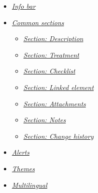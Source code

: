 \documentclass[letterpaper,10pt,english]{sphinxmanual}
\begin{document}
{\begin{minipage}{0.95\linewidth}
\begin{itemize}
\begin{itemize}
\item {} 
\label{Gui:id27}{\hyperref[Gui:email-detail]{\emph{Email detail}}}

\item {} 
\label{Gui:id28}{\hyperref[Gui:multiple-update]{\emph{Multiple update}}}

\item {} 
\label{Gui:id29}{\hyperref[Gui:combo-list-fields]{\emph{Combo list fields}}}

\item {} 
\label{Gui:id30}{\hyperref[Gui:long-text-fields]{\emph{Long text fields}}}

\end{itemize}

\item {} 
\label{Gui:id31}{\hyperref[Gui:info-bar]{\emph{Info bar}}}

\item {} 
\label{Gui:id32}{\hyperref[Gui:common-sections]{\emph{Common sections}}}
\begin{itemize}
\item {} 
\label{Gui:id33}{\hyperref[Gui:section-description]{\emph{Section: Description}}}

\item {} 
\label{Gui:id34}{\hyperref[Gui:section-treatment]{\emph{Section: Treatment}}}

\item {} 
\label{Gui:id35}{\hyperref[Gui:section-checklist]{\emph{Section: Checklist}}}

\item {} 
\label{Gui:id36}{\hyperref[Gui:section-linked-element]{\emph{Section: Linked element}}}

\item {} 
\label{Gui:id37}{\hyperref[Gui:section-attachments]{\emph{Section: Attachments}}}

\item {} 
\label{Gui:id38}{\hyperref[Gui:section-notes]{\emph{Section: Notes}}}

\item {} 
\label{Gui:id39}{\hyperref[Gui:section-change-history]{\emph{Section: Change history}}}

\end{itemize}

\item {} 
\label{Gui:id40}{\hyperref[Gui:alerts]{\emph{Alerts}}}

\item {} 
\label{Gui:id41}{\hyperref[Gui:themes]{\emph{Themes}}}

\item {} 
\label{Gui:id42}{\hyperref[Gui:multilingual]{\emph{Multilingual}}}

\end{itemize}
\end{minipage}}
\end{document}
